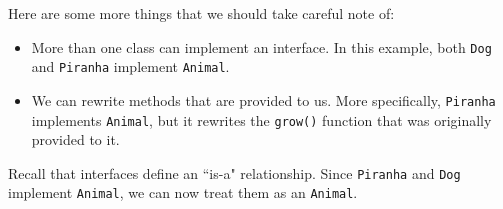 Here are some more things that we should take careful note of: \begin{itemize}
    \item More than one class can implement an interface. In this example, both \verb!Dog! and \verb!Piranha! implement \verb!Animal!.
    \item We can rewrite methods that are provided to us. More specifically, \verb!Piranha! implements \verb!Animal!, but it rewrites the \verb!grow()! function that was originally provided to it.
\end{itemize}

Recall that interfaces define an ``is-a" relationship. Since \verb!Piranha! and \verb!Dog! implement \verb!Animal!, we can now treat them as an \verb!Animal!.